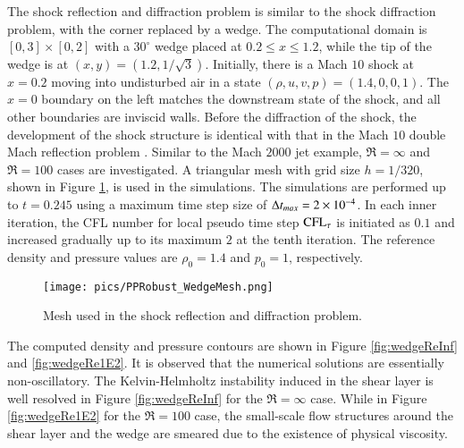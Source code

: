 The shock reflection and diffraction problem \cite{zhang2017positivity} is similar to the shock diffraction problem,
with the corner replaced by a wedge. The computational domain is $[0,3]\times[0,2]$
with a $30^\circ$ wedge placed at $0.2 \leq x \leq 1.2$, while the
tip of the wedge is at $(x,y) = (1.2, 1/\sqrt{3})$.
Initially, there is a Mach $10$ shock at $x=0.2$ moving into undisturbed air in a state $(\rho, u, v, p) = (1.4,0,0,1)$. The $x=0$ boundary on
the left matches the downstream state of the shock, and all other boundaries
are inviscid walls.
Before the diffraction of the shock, the development
of the shock structure is identical with that in the Mach $10$ double Mach reflection problem \cite{woodward1984dmr}.
Similar to the Mach $2000$ jet example, $\Re=\infty$ and $\Re=100$ cases
are investigated.
A triangular mesh with grid size $h = 1/320$,
shown in Figure \ref{fig:wedgeMesh}, is used in the simulations.
The simulations are performed up to $t=0.245$ using
a maximum time step size of $\mathrm\Delta t_{max}= 2\times10^{-4}$.
In each inner iteration, the CFL number for local pseudo time step $\text{CFL}_\tau$ is initiated as $0.1$
and increased gradually up to its maximum $2$ at the tenth iteration.
The reference density and pressure values are $\rho_0=1.4$ and $p_0=1$, respectively.

\begin{figure}[htbp]
    \centering
    \texttt{[image: pics/PPRobust\_WedgeMesh.png]}
    \caption{Mesh used in the shock reflection and diffraction problem.}
    \label{fig:wedgeMesh}
\end{figure}

The computed density and pressure contours are shown in Figure \ref{fig:wedgeReInf} and \ref{fig:wedgeRe1E2}.
It is observed that the numerical solutions are essentially non-oscillatory.
The Kelvin-Helmholtz instability induced in the shear layer is well resolved in Figure \ref{fig:wedgeReInf} for the $\Re=\infty$ case.
While in Figure  \ref{fig:wedgeRe1E2} for the $\Re=100$ case,
the small-scale flow structures around the shear layer and the wedge are smeared  due to the existence of physical viscosity.

